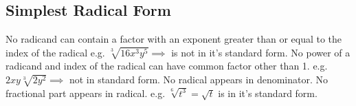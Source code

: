 \subsection{Simplest Radical Form}
No radicand can contain a factor with an exponent greater than or equal to the index of the radical e.g. $ \sqrt[3]{16x^3y^5} \implies $ is not in it's standard form. No power of a radicand and index of the radical can have common factor other than 1. e.g. $ 2xy\sqrt[3]{2y^2} \implies $ not in standard form. No radical appears in denominator. No fractional part appears in radical.
e.g. $ \sqrt[6]{t^3} = \sqrt{t} $ is in it's standard form.